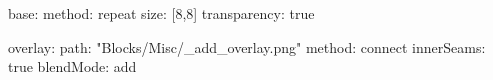 base:
  method: repeat
  size: [8,8]
  transparency: true

overlay:
  path: "Blocks/Misc/_add_overlay.png"
  method: connect
  innerSeams: true
  blendMode: add
